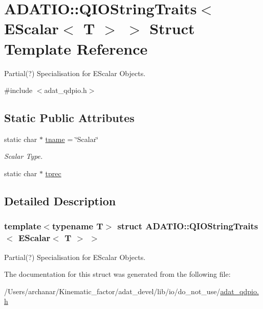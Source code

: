 \hypertarget{structADATIO_1_1QIOStringTraits_3_01EScalar_3_01T_01_4_01_4}{}\section{A\+D\+A\+T\+IO\+:\+:Q\+I\+O\+String\+Traits$<$ E\+Scalar$<$ T $>$ $>$ Struct Template Reference}
\label{structADATIO_1_1QIOStringTraits_3_01EScalar_3_01T_01_4_01_4}


Partial(?) Specialisation for E\+Scalar Objects.  




{\ttfamily \#include $<$adat\+\_\+qdpio.\+h$>$}

\subsection*{Static Public Attributes}
\begin{DoxyCompactItemize}
\item 
static char $\ast$ \mbox{\hyperlink{group__qio_gaf5e0f914e1c7e78a69472bffe5e470b7}{tname}} = \char`\"{}Scalar\char`\"{}
\begin{DoxyCompactList}\small\item\em Scalar Type. \end{DoxyCompactList}\item 
static char $\ast$ \mbox{\hyperlink{group__qio_ga44058d03fc17a4d1cee98691456d4ae9}{tprec}}
\end{DoxyCompactItemize}


\subsection{Detailed Description}
\subsubsection*{template$<$typename T$>$\newline
struct A\+D\+A\+T\+I\+O\+::\+Q\+I\+O\+String\+Traits$<$ E\+Scalar$<$ T $>$ $>$}

Partial(?) Specialisation for E\+Scalar Objects. 

The documentation for this struct was generated from the following file\+:\begin{DoxyCompactItemize}
\item 
/\+Users/archanar/\+Kinematic\+\_\+factor/adat\+\_\+devel/lib/io/do\+\_\+not\+\_\+use/\mbox{\hyperlink{adat__qdpio_8h}{adat\+\_\+qdpio.\+h}}\end{DoxyCompactItemize}
